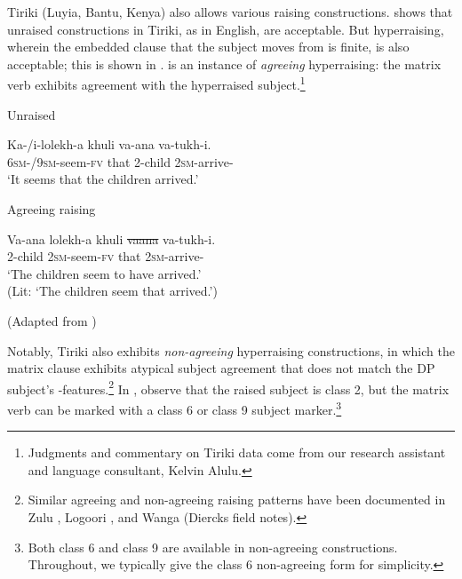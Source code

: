 \documentclass[output=paper,colorlinks,citecolor=brown
]{langscibook}
\begin{document}
Tiriki (Luyia, Bantu, Kenya) also allows various raising constructions.  shows that unraised constructions in Tiriki, as in English, are acceptable. But hyperraising, wherein the embedded clause that the subject moves from is finite, is also acceptable; this is shown in .  is an instance of \textit{agreeing} hyperraising: the matrix verb exhibits agreement with the hyperraised subject.\footnote{Judgments and commentary on Tiriki data come from our research assistant and language consultant, Kelvin Alulu.}

\ea \label{ex:johnson:TirikiHrParadigm}
\begin{xlist}

\ex\label{ex:johnson:TirikiUnraisedConstruction} {{Unraised}}

\gll Ka-/i-lolekh-a khuli va-ana va-tukh-i.\\
\textsc{6sm-/9sm-}seem-\textsc{fv} that 2-child \textsc{2sm}-arrive-\Pst{}\\ 
\glt `It seems that the children arrived.'

\citep[97]{diercksetal2022luyia}

\ex \label{ex:johnson:IntroAgreeingRaising} {{Agreeing raising}}

\gll Va-ana lolekh-a khuli \sout{vaana} va-tukh-i.\\
2-child \textsc{2sm-}seem-\textsc{fv} that {} \textsc{2sm}-arrive-\Pst{} \\
\glt `The children seem to have arrived.'\\
(Lit: `The children seem that arrived.')

(Adapted from \citealt[98]{diercksetal2022luyia})
\end{xlist}
\z 

Notably, Tiriki also exhibits \textit{non-agreeing} hyperraising constructions, in which the matrix clause exhibits atypical subject agreement that does not match the DP subject's \ph-features.\footnote{Similar agreeing and non-agreeing raising patterns have been documented in Zulu \citep{Halpert2019RaisingUnphased}, Logoori \citep{GluckmanBowler:2017:LogooriExpletives}, and Wanga (Diercks field notes).} In , observe that the raised subject is class 2, but the matrix verb can be marked with a class 6 or class 9 subject marker.\footnote{Both class 6 and class 9 are available in non-agreeing constructions. Throughout, we typically give the class 6 non-agreeing form for simplicity.}
\end{document}
